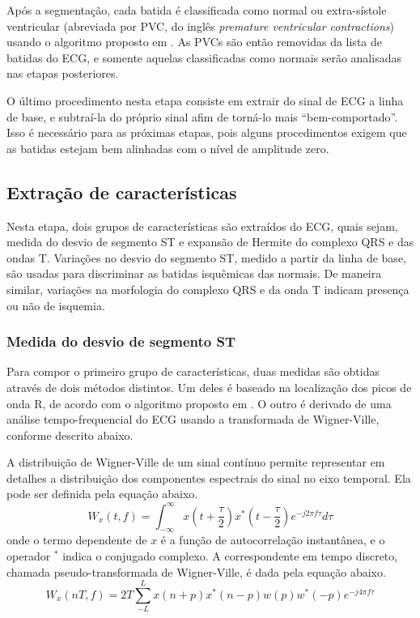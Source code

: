 Após a segmentação, cada batida é classificada como normal ou extra-sístole ventricular (abreviada por PVC, do inglês \emph{premature ventricular contractions}) usando o algoritmo proposto em \cite{Couceiro08}. As PVCs são então removidas da lista de batidas do ECG, e somente aquelas classificadas como normais serão analisadas nas etapas posteriores.

O último procedimento nesta etapa consiste em extrair do sinal de ECG a linha de base, e subtraí-la do próprio sinal afim de torná-lo mais ``bem-comportado''. Isso é necessário para as próximas etapas, pois alguns procedimentos exigem que as batidas estejam bem alinhadas com o nível de amplitude zero.

\subsection{Extração de características}
Nesta etapa, dois grupos de características são extraídos do ECG, quais sejam, medida do desvio de segmento ST e expansão de Hermite do complexo QRS e das ondas T. Variações no desvio do segmento ST, medido a partir da linha de base, são usadas para discriminar as batidas isquêmicas das normais. De maneira similar, variações na morfologia do complexo QRS e da onda T indicam presença ou não de isquemia.

\subsubsection{Medida do desvio de segmento ST}
Para compor o primeiro grupo de características, duas medidas são obtidas através de dois métodos distintos. Um deles é baseado na localização dos picos de onda R, de acordo com o algoritmo proposto em \cite{Pang05}. O outro é derivado de uma análise tempo-frequencial do ECG usando a transformada de Wigner-Ville, conforme descrito abaixo.

A distribuição de Wigner-Ville de um sinal contínuo permite representar em detalhes a distribuição dos componentes espectrais do sinal no eixo temporal. Ela pode ser definida pela equação abaixo.
\begin{equation} \label{equ:wigner_ville}
    W_x(t,f) = \int_{-\infty}^{\infty} x\left( t+\frac{\tau}{2} \right) x^*\left( t-\frac{\tau}{2} \right) e^{-j2\pi f \tau} d\tau
\end{equation}
onde o termo dependente de $x$ é a função de autocorrelação instantânea, e o operador $^*$ indica o conjugado complexo. A correspondente em tempo discreto, chamada pseudo-transformada de Wigner-Ville, é dada pela equação abaixo.
\begin{equation} \label{equ:pseudo_wigner_ville}
    W_x(nT,f) = 2T\sum_{-L}^{L}x(n+p)x^*(n-p)w(p)w^*(-p)e^{-j4\pi f\tau}
\end{equation}

